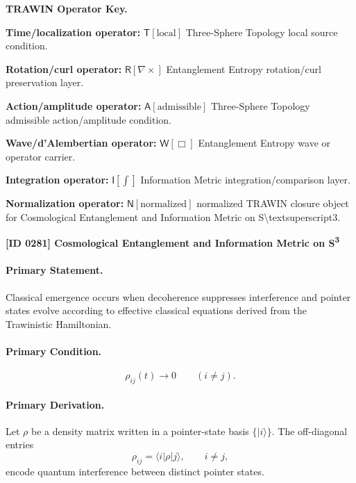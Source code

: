 \par\vspace{0.45\baselineskip}
\noindent\begin{minipage}[t]{\linewidth}
\begingroup
\small
\raggedright
\textbf{TRAWIN Operator Key.}\par
\noindent\textbf{Time/localization operator:} $\mathsf{T}\!\left[\mathrm{local}\right]$ Three-Sphere Topology local source condition.\par
\noindent\textbf{Rotation/curl operator:} $\mathsf{R}\!\left[\nabla\times\right]$ Entanglement Entropy rotation/curl preservation layer.\par
\noindent\textbf{Action/amplitude operator:} $\mathsf{A}\!\left[\mathrm{admissible}\right]$ Three-Sphere Topology admissible action/amplitude condition.\par
\noindent\textbf{Wave/d'Alembertian operator:} $\mathsf{W}\!\left[\Box\right]$ Entanglement Entropy wave or operator carrier.\par
\noindent\textbf{Integration operator:} $\mathsf{I}\!\left[\int\right]$ Information Metric integration/comparison layer.\par
\noindent\textbf{Normalization operator:} $\mathsf{N}\!\left[\mathrm{normalized}\right]$ normalized TRAWIN closure object for Cosmological Entanglement and Information Metric on S\textbackslash{}textsuperscript3.\par
\endgroup
\end{minipage}

\clearpage
\noindent\textbf{[ID 0281] Cosmological Entanglement and Information Metric on S\textsuperscript3}\par
\vspace{0.35em}
\paragraph{Primary Statement.}
Classical emergence occurs when decoherence suppresses interference and pointer states evolve according to effective classical equations derived from the Trawinistic Hamiltonian.

\paragraph{Primary Condition.}
\begin{equation}
\rho_{ij}(t)\rightarrow 0
\qquad
(i\neq j).
\end{equation}

\paragraph{Primary Derivation.}
Let $\rho$ be a density matrix written in a pointer-state basis $\{|i\rangle\}$.  
The off-diagonal entries
\begin{equation}
\rho_{ij}
=
\langle i|\rho|j\rangle,
\qquad i\neq j,
\end{equation}
encode quantum interference between distinct pointer states.

